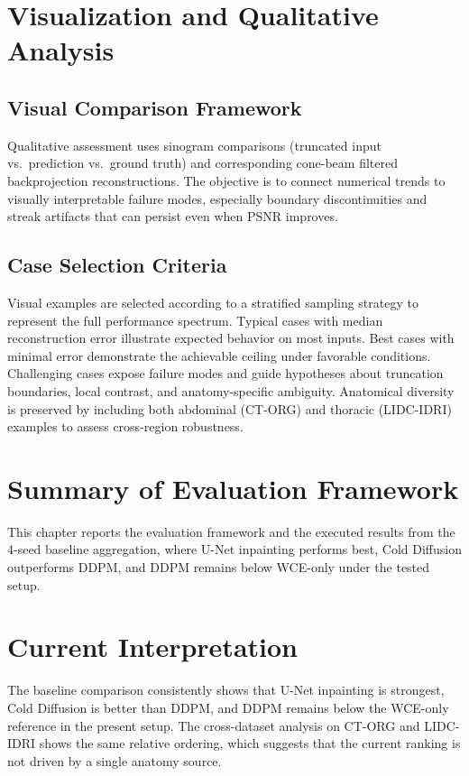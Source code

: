 \section{Visualization and Qualitative Analysis}

\subsection{Visual Comparison Framework}

Qualitative assessment uses sinogram comparisons (truncated input vs.\ prediction vs.\ ground truth) and corresponding cone-beam filtered backprojection reconstructions. The objective is to connect numerical trends to visually interpretable failure modes, especially boundary discontinuities and streak artifacts that can persist even when PSNR improves.

\subsection{Case Selection Criteria}

Visual examples are selected according to a stratified sampling strategy to represent the full performance spectrum. Typical cases with median reconstruction error illustrate expected behavior on most inputs. Best cases with minimal error demonstrate the achievable ceiling under favorable conditions. Challenging cases expose failure modes and guide hypotheses about truncation boundaries, local contrast, and anatomy-specific ambiguity. Anatomical diversity is preserved by including both abdominal (CT-ORG) and thoracic (LIDC-IDRI) examples to assess cross-region robustness.

\section{Summary of Evaluation Framework}

This chapter reports the evaluation framework and the executed results from the 4-seed baseline aggregation, where U-Net inpainting performs best, Cold Diffusion outperforms DDPM, and DDPM remains below WCE-only under the tested setup.

\section{Current Interpretation}

The baseline comparison consistently shows that U-Net inpainting is strongest, Cold Diffusion is better than DDPM, and DDPM remains below the WCE-only reference in the present setup. The cross-dataset analysis on CT-ORG and LIDC-IDRI shows the same relative ordering, which suggests that the current ranking is not driven by a single anatomy source.
